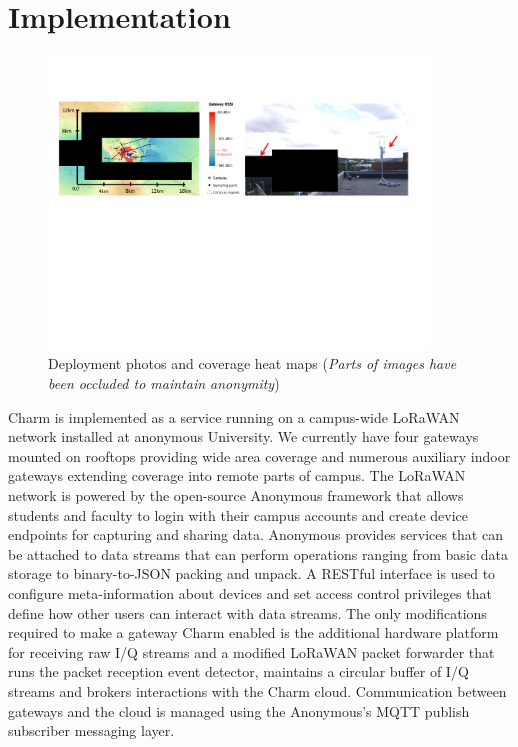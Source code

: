 \section{Implementation}
\label{sec:implementation}

\begin{figure}
    \centering
    \includegraphics[width=0.9\textwidth]{figures/deployment.pdf}
    \caption{Deployment photos and coverage heat maps (\textit{Parts of images have been occluded to maintain anonymity})}
    \label{fig:deployment}
\end{figure}

Charm is implemented as a service running on a campus-wide LoRaWAN network installed at anonymous University.  We currently have four gateways mounted on rooftops providing wide area coverage and numerous auxiliary indoor gateways extending coverage into remote parts of campus. The LoRaWAN network is powered by the open-source Anonymous framework that allows students and faculty to login with their campus accounts and create device endpoints for capturing and sharing data.  Anonymous provides services that can be attached to data streams that can perform operations ranging from basic data storage to binary-to-JSON packing and unpack. A RESTful interface is used to configure meta-information about devices and set access control privileges that define how other users can interact with data streams.  The only modifications required to make a gateway Charm enabled is the additional hardware platform for receiving raw I/Q streams and a modified LoRaWAN packet forwarder that runs the packet reception event detector, maintains a circular buffer of I/Q streams and brokers interactions with the Charm cloud.  Communication between gateways and the cloud is managed using the Anonymous's MQTT publish subscriber messaging layer.

